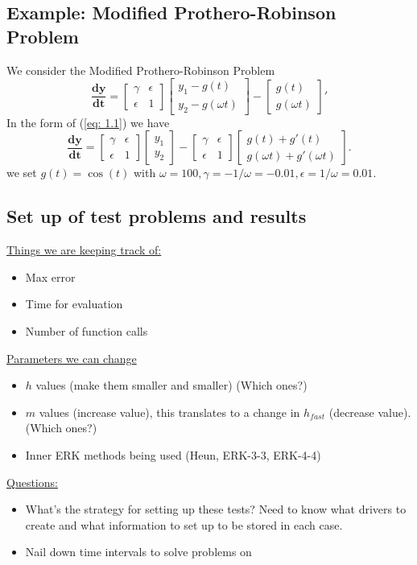 \documentclass[12pt]{article}
\begin{document}
\subsection{Example: Modified Prothero-Robinson Problem}
We consider the Modified Prothero-Robinson Problem
\begin{equation}
\mathbf{\frac{dy}{dt}} = \begin{bmatrix}
\gamma & \epsilon \\ \epsilon & 1
\end{bmatrix}    \begin{bmatrix} y_1 - g(t) \\ y_2 - g(\omega t) \end{bmatrix} - \begin{bmatrix}
g(t) \\ g(\omega t)
\end{bmatrix}' 
\end{equation}
In the form of (\ref{eq: 1.1}) we have \begin{equation}
\mathbf{\frac{dy}{dt}} = \begin{bmatrix}
\gamma & \epsilon \\ \epsilon & 1
\end{bmatrix}    \begin{bmatrix} y_1 \\ y_2 \end{bmatrix} - \begin{bmatrix}
\gamma & \epsilon \\ \epsilon & 1
\end{bmatrix} \begin{bmatrix} g(t)+ g'(t)\\ g(\omega t)+g'(\omega t) \end{bmatrix}. 
\end{equation}
we set $g(t) = \cos(t)$ with $\omega = 100, \gamma = - 1/ \omega = -0.01 , \epsilon = 1/\omega = 0.01$.
\subsection{Set up of test problems and results}
\underline{Things we are keeping track of:} 
\begin{itemize}
\item Max error
\item Time for evaluation
\item Number of function calls
\end{itemize}
\underline{Parameters we can change}
\begin{itemize}
\item $h$ values (make them smaller and smaller) (Which ones?)
\item $m$ values (increase value), this translates to a change in $h_{fast}$ (decrease value). (Which ones?) 
\item Inner ERK methods being used (Heun, ERK-3-3, ERK-4-4)
\end{itemize}

\underline{Questions:}
\begin{itemize}
\item What's the strategy for setting up these tests? Need to know what drivers to create and what information to set up to be stored in each case. 
\item Nail down time intervals to solve problems on
\end{itemize}
\end{document}
